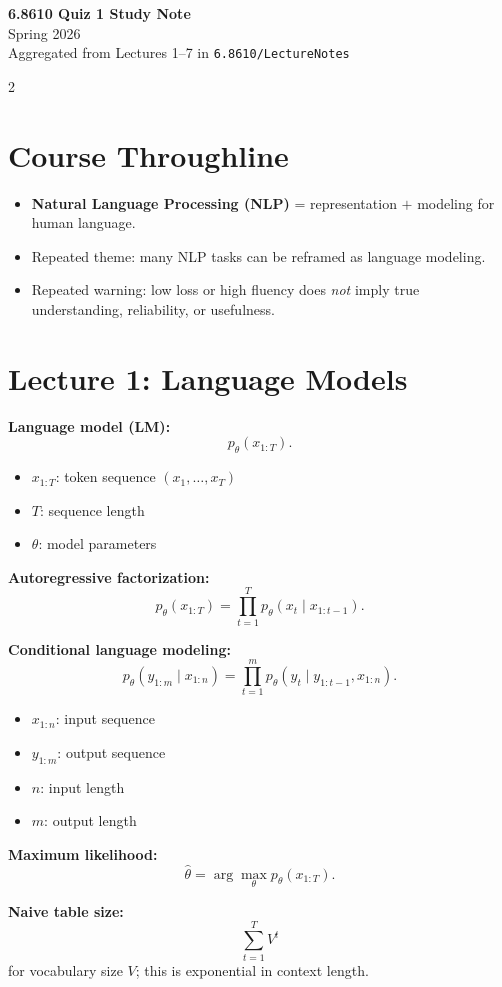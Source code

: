 \documentclass[10pt]{article}
\newenvironment{symdefs}{\begin{itemize}[leftmargin=1.1em, topsep=1pt, itemsep=0pt, parsep=0pt]}{\end{itemize}}
\newcommand{\sym}[2]{\item \textbf{#1}: #2}
\begin{document}
\small

\begin{center}
{\Large \textbf{6.8610 Quiz 1 Study Note}}\\
Spring 2026\\
Aggregated from Lectures 1--7 in \texttt{6.8610/LectureNotes}
\end{center}

\begin{multicols*}{2}
\raggedcolumns

\section*{Course Throughline}
\begin{itemize}
\item \textbf{Natural Language Processing (NLP)} = representation \(+\) modeling for human language.
\item Repeated theme: many NLP tasks can be reframed as language modeling.
\item Repeated warning: low loss or high fluency does \emph{not} imply true understanding, reliability, or usefulness.
\end{itemize}

\section*{Lecture 1: Language Models}
\textbf{Language model (LM):}
\[
p_\theta(x_{1:T}).
\]
\begin{symdefs}
\sym{\(x_{1:T}\)}{token sequence \((x_1,\dots,x_T)\)}
\sym{\(T\)}{sequence length}
\sym{\(\theta\)}{model parameters}
\end{symdefs}

\textbf{Autoregressive factorization:}
\[
p_\theta(x_{1:T})=\prod_{t=1}^{T} p_\theta(x_t \mid x_{1:t-1}).
\]

\textbf{Conditional language modeling:}
\[
p_\theta(y_{1:m}\mid x_{1:n})
=
\prod_{t=1}^{m} p_\theta(y_t \mid y_{1:t-1}, x_{1:n}).
\]
\begin{symdefs}
\sym{\(x_{1:n}\)}{input sequence}
\sym{\(y_{1:m}\)}{output sequence}
\sym{\(n\)}{input length}
\sym{\(m\)}{output length}
\end{symdefs}

\textbf{Maximum likelihood:}
\[
\hat{\theta}=\arg\max_\theta p_\theta(x_{1:T}).
\]

\textbf{Naive table size:}
\[
\sum_{t=1}^{T} V^t
\]
for vocabulary size \(V\); this is exponential in context length.


\end{multicols*}
\end{document}
